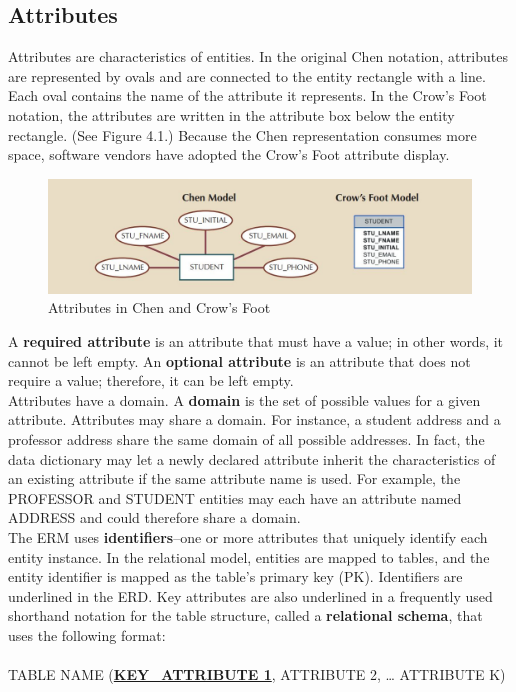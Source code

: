\documentclass[a4paper, 12pt, titlepage]{report}
\begin{document}
{\subsection{Attributes}
Attributes are characteristics of entities. In the original Chen notation, attributes are represented by ovals and are connected to the entity rectangle with a line. Each oval contains the name of the attribute it represents. In the Crow’s Foot notation, the attributes are written in the attribute box below the entity rectangle. (See Figure 4.1.) Because the Chen representation consumes more space, software vendors have adopted the Crow’s Foot attribute display.
\begin{figure}[H]
\centering
\includegraphics[scale=0.5]{Attr}
\caption{Attributes in Chen and Crow’s Foot}
\end{figure}
\noindent A \textbf{required attribute} is an attribute that must have a value; in other words, it cannot be left empty. An \textbf{optional attribute} is an attribute that does not require a value; therefore, it can be left empty.\\
Attributes have a domain. A \textbf{domain} is the set of possible values for a given attribute. Attributes may share a domain. For instance, a student address and a professor
address share the same domain of all possible addresses. In fact, the data dictionary may let a newly declared attribute inherit the characteristics of an existing attribute if the
same attribute name is used. For example, the PROFESSOR and STUDENT entities may each have an attribute named ADDRESS and could therefore share a domain.\\
The ERM uses \textbf{identifiers}--one or more attributes that uniquely identify each entity instance. In the relational model, entities are mapped to tables, and the entity identifier is mapped as the table’s primary key (PK). Identifiers are underlined in the ERD. Key attributes are also underlined in a frequently used shorthand notation for the table structure, called a \textbf{relational schema}, that uses the following format:\\ \\
TABLE NAME (\uline{\textbf{{KEY\_ATTRIBUTE 1}}}, ATTRIBUTE 2, … ATTRIBUTE K)\\ \\
}
\end{document}
